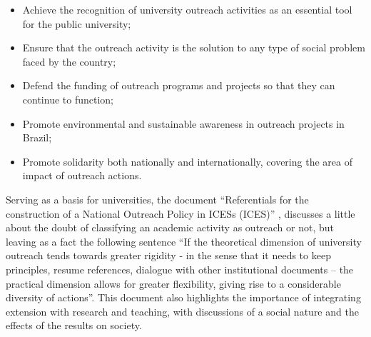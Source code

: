 \begin{itemize}
    \item Achieve the recognition of university outreach activities as an essential tool for the public university;
    \item Ensure that the outreach activity is the solution to any type of social problem faced by the country;
    \item Defend the funding of outreach programs and projects so that they can continue to function;
    \item Promote environmental and sustainable awareness in outreach projects in Brazil;
    \item Promote solidarity both nationally and internationally, covering the area of impact of outreach actions.
\end{itemize}


Serving as a basis for universities, the document ``Referentials for the construction of a National Outreach Policy in \aclp{ICES} (\ac{ICES})'' \cite{referenciaisPolitica},
discusses a little about the doubt of classifying an academic activity as outreach or not, but leaving as a fact the following sentence ``If the theoretical dimension of university outreach tends towards greater rigidity - in the sense that it needs to keep principles, resume references,
dialogue with other institutional documents – the practical dimension allows for greater flexibility, giving rise to a considerable diversity of actions''.
This document also highlights the importance of integrating extension with research and teaching, with discussions of a social nature and the effects of the results on society.

